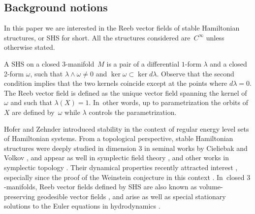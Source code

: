 \documentclass[10pt]{amsart}
\newcommand{\threemanifold}{$3$\nobreakdash-mani\-fold\xspace}
\newcommand{\threemanifolds}{$3$\nobreakdash-mani\-folds\xspace}
\theoremstyle{definition}
\begin{document}
\subsection{Background notions}
In this paper we are interested in the Reeb vector fields of stable Hamiltonian structures, or SHS for short. All the structures considered are~$C^\infty$ unless otherwise stated.

A SHS on a closed \threemanifold~$M$ is a pair of a differential $1$-form $\lambda$ and a closed 2-form $\omega$, such that $\lambda\wedge \omega\neq 0$ and $\ker \omega\subset \ker d\lambda$. Observe that the second condition implies that the two kernels coincide except at the points where $d\lambda=0$. The Reeb vector field is defined as the unique vector field spanning the kernel of $\omega$ and such that $\lambda(X)=1$. In~other words, up to parametrization the orbits of $X$ are defined by~$\omega$ while $\lambda$ controls the parametrization.

Hofer and Zehnder \cite{HZ} introduced stability in the context of regular energy level sets of Hamiltonian systems. From a topological perspective, stable Hamiltonian structures were deeply studied in dimension 3 in seminal works by Cieliebak and Volkov \cite{CV0, CV1}, and appear as well in symplectic field theory \cite{EGH, BEHWZ, CiMo}, and other works in symplectic topology \cite{EKP, W1, LW, NW, MNW,MS}. Their dynamical properties recently attracted interest \cite{CFP1,CFP2, MP, CV2, C}, especially since the proof of the Weinstein conjecture in this context \cite{HT, Re}. In~closed \threemanifolds, Reeb vector fields defined by SHS are also known as volume-preserving geodesible vector fields \cite{Re}, and arise as well as special stationary solutions to the Euler equations in hydrodynamics \cite{CV1}.
\end{document}
